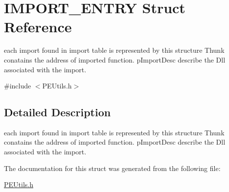 \hypertarget{struct_i_m_p_o_r_t___e_n_t_r_y}{}\section{I\+M\+P\+O\+R\+T\+\_\+\+E\+N\+T\+RY Struct Reference}
\label{struct_i_m_p_o_r_t___e_n_t_r_y}


each import found in import table is represented by this structure Thunk conatains the address of imported function. p\+Import\+Desc describe the Dll associated with the import.  




{\ttfamily \#include $<$P\+E\+Utils.\+h$>$}



\subsection{Detailed Description}
each import found in import table is represented by this structure Thunk conatains the address of imported function. p\+Import\+Desc describe the Dll associated with the import. 

The documentation for this struct was generated from the following file\+:\begin{DoxyCompactItemize}
\item 
\mbox{\hyperlink{_p_e_utils_8h}{P\+E\+Utils.\+h}}\end{DoxyCompactItemize}
